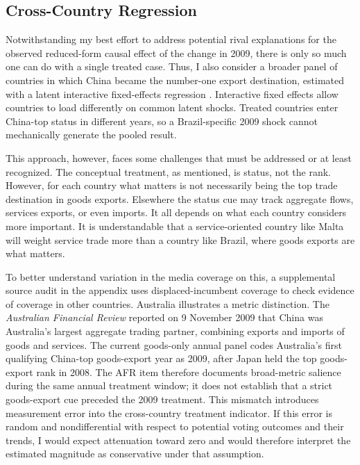 \documentclass[referee,pdflatex,sn-basic]{sn-jnl}
\theoremstyle{thmstylethree}
\begin{document}
\subsection{Cross-Country Regression}\label{cross-country-regression}

Notwithstanding my best effort to address potential rival explanations for the observed reduced-form causal effect of the change in 2009, there is only so much one can do with a single treated case. Thus, I also consider a broader panel of countries in which China became the number-one export destination, estimated with a latent interactive fixed-effects regression \citep{liu2024practical}. Interactive fixed effects allow countries to load differently on common latent shocks. Treated countries enter China-top status in different years, so a Brazil-specific 2009 shock cannot mechanically generate the pooled result.

This approach, however, faces some challenges that must be addressed or at least recognized. The conceptual treatment, as mentioned, is status, not the rank. However, for each country what matters is not necessarily being the top trade destination in goods exports. Elsewhere the status cue may track aggregate flows, services exports, or even imports. It all depends on what each country considers more important. It is understandable that a service-oriented country like Malta will weight service trade more than a country like Brazil, where goods exports are what matters.

To better understand variation in the media coverage on this, a supplemental source audit in the appendix uses displaced-incumbent coverage to check evidence of coverage in other countries. Australia illustrates a metric distinction. The \emph{Australian Financial Review} reported on 9 November 2009 that China was Australia's largest aggregate trading partner, combining exports and imports of goods and services. The current goods-only annual panel codes Australia's first qualifying China-top goods-export year as 2009, after Japan held the top goods-export rank in 2008. The AFR item therefore documents broad-metric salience during the same annual treatment window; it does not establish that a strict goods-export cue preceded the 2009 treatment. This mismatch introduces measurement error into the cross-country treatment indicator. If this error is random and nondifferential with respect to potential voting outcomes and their trends, I would expect attenuation toward zero and would therefore interpret the estimated magnitude as conservative under that assumption.
\end{document}
